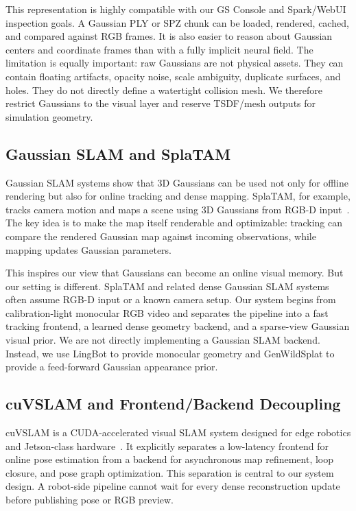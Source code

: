 \documentclass[11pt]{article}
\begin{document}
This representation is highly compatible with our GS Console and Spark/WebUI inspection goals. A Gaussian PLY or SPZ chunk can be loaded, rendered, cached, and compared against RGB frames. It is also easier to reason about Gaussian centers and coordinate frames than with a fully implicit neural field. The limitation is equally important: raw Gaussians are not physical assets. They can contain floating artifacts, opacity noise, scale ambiguity, duplicate surfaces, and holes. They do not directly define a watertight collision mesh. We therefore restrict Gaussians to the visual layer and reserve TSDF/mesh outputs for simulation geometry.

\subsection{Gaussian SLAM and SplaTAM}

Gaussian SLAM systems show that 3D Gaussians can be used not only for offline rendering but also for online tracking and dense mapping. SplaTAM, for example, tracks camera motion and maps a scene using 3D Gaussians from RGB-D input~\cite{keetha2024splatam}. The key idea is to make the map itself renderable and optimizable: tracking can compare the rendered Gaussian map against incoming observations, while mapping updates Gaussian parameters.

This inspires our view that Gaussians can become an online visual memory. But our setting is different. SplaTAM and related dense Gaussian SLAM systems often assume RGB-D input or a known camera setup. Our system begins from calibration-light monocular RGB video and separates the pipeline into a fast tracking frontend, a learned dense geometry backend, and a sparse-view Gaussian visual prior. We are not directly implementing a Gaussian SLAM backend. Instead, we use LingBot to provide monocular geometry and GenWildSplat to provide a feed-forward Gaussian appearance prior.

\subsection{cuVSLAM and Frontend/Backend Decoupling}

cuVSLAM is a CUDA-accelerated visual SLAM system designed for edge robotics and Jetson-class hardware~\cite{korovko2025cuvslam}. It explicitly separates a low-latency frontend for online pose estimation from a backend for asynchronous map refinement, loop closure, and pose graph optimization. This separation is central to our system design. A robot-side pipeline cannot wait for every dense reconstruction update before publishing pose or RGB preview.
\end{document}

